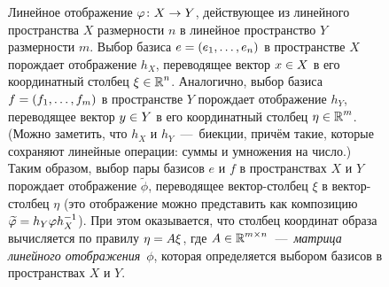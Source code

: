 \documentclass[a4paper,12pt]{article}
\begin{document}
  \begin{figure}[h]
    \centering
    
    
    \caption{Линейное отображение $\phi \hm\colon X \hm\to Y$, действующее из линейного пространства $X$ размерности $n$ в линейное пространство $Y$ размерности $m$.
      Выбор базиса $e \hm= (e_1, \ldots, e_n)$ в пространстве $X$ порождает отображение $h_X$, переводящее вектор $x \hm\in X$ в его координатный столбец $\xi \hm\in \RR^n$.
      Аналогично, выбор базиса $f \hm= (f_1, \ldots, f_m)$ в пространстве $Y$ порождает отображение $h_Y$, переводящее вектор $y \hm\in Y$ в его координатный столбец $\eta \hm\in \RR^m$.
      (Можно заметить, что $h_X$ и $h_Y$~---~биекции, причём такие, которые сохраняют линейные операции: суммы и умножения на число.)
      Таким образом, выбор пары базисов $e$ и $f$ в пространствах $X$ и $Y$ порождает отображение $\widetilde \phi$, переводящее вектор-столбец $\xi$ в вектор-столбец $\eta$ (это отображение можно представить как композицию $\widetilde \phi \hm= h_Y \phi h_X^{-1}$).
      При этом оказывается, что столбец координат образа вычисляется по правилу $\eta \hm= A \xi$, где $A \hm\in \RR^{m \times n}$~---~\emph{матрица линейного отображения}~$\phi$, которая определяется выбором базисов в пространствах $X$ и $Y$.
    }
    \label{fig:map-maps-map-to-map}
  \end{figure}
  
\end{document}
